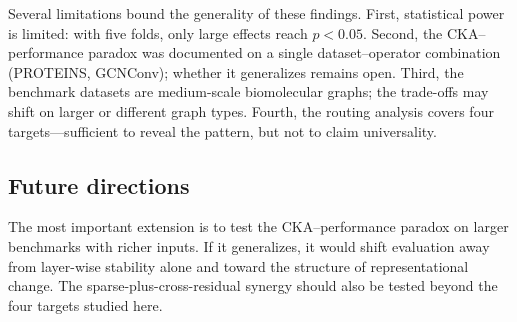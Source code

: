 Several limitations bound the generality of these findings. First, statistical power is limited: with five folds, only large effects reach $p < 0.05$. Second, the CKA--performance paradox was documented on a single dataset--operator combination (PROTEINS, GCNConv); whether it generalizes remains open. Third, the benchmark datasets are medium-scale biomolecular graphs; the trade-offs may shift on larger or different graph types. Fourth, the routing analysis covers four targets---sufficient to reveal the pattern, but not to claim universality.

\subsection{Future directions}

The most important extension is to test the CKA--performance paradox on larger benchmarks with richer inputs. If it generalizes, it would shift evaluation away from layer-wise stability alone and toward the structure of representational change. The sparse-plus-cross-residual synergy should also be tested beyond the four targets studied here.
